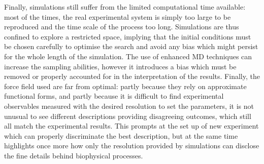 Finally, simulations still suffer from the limited computational time available: most of the times, the real experimental system is simply too large to be reproduced and the time scale of the process too long. Simulations are thus confined to explore a restricted space, implying that the initial conditions must be chosen carefully to optimise the search and avoid any bias which might persist for the whole length of the simulation. The use of enhanced MD techniques can increase the sampling abilities, however it introduces a bias which must be removed or properly accounted for in the interpretation of the results. Finally, the force field used are far from optimal: partly because they rely on approximate functional forms, and partly because it is difficult to find experimental observables measured with the desired resolution to set the parameters, it is not unusual to see different descriptions providing disagreeing outcomes, which still all match the experimental results. This prompts at the set up of new experiment which can properly discriminate the best description, but at the same time highlights once more how only the resolution provided by simulations can disclose the fine details behind biophysical processes.

